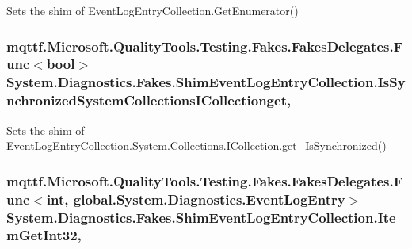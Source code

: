 Sets the shim of Event\-Log\-Entry\-Collection.\-Get\-Enumerator()

\hypertarget{class_system_1_1_diagnostics_1_1_fakes_1_1_shim_event_log_entry_collection_ac5a132ce5957031fd8fbc2b34b621eaf}{
\subsubsection[{Is\-Synchronized\-System\-Collections\-I\-Collectionget}]{\setlength{\rightskip}{0pt plus 5cm}mqttf.\-Microsoft.\-Quality\-Tools.\-Testing.\-Fakes.\-Fakes\-Delegates.\-Func$<$bool$>$ System.\-Diagnostics.\-Fakes.\-Shim\-Event\-Log\-Entry\-Collection.\-Is\-Synchronized\-System\-Collections\-I\-Collectionget\hspace{0.3cm}{\ttfamily [get]}, {\ttfamily [set]}}}\label{class_system_1_1_diagnostics_1_1_fakes_1_1_shim_event_log_entry_collection_ac5a132ce5957031fd8fbc2b34b621eaf}


Sets the shim of Event\-Log\-Entry\-Collection.\-System.\-Collections.\-I\-Collection.\-get\-\_\-\-Is\-Synchronized()

\hypertarget{class_system_1_1_diagnostics_1_1_fakes_1_1_shim_event_log_entry_collection_a33ab105e1174a3dd3427a8e2fb27635a}{
\subsubsection[{Item\-Get\-Int32}]{\setlength{\rightskip}{0pt plus 5cm}mqttf.\-Microsoft.\-Quality\-Tools.\-Testing.\-Fakes.\-Fakes\-Delegates.\-Func$<$int, global.\-System.\-Diagnostics.\-Event\-Log\-Entry$>$ System.\-Diagnostics.\-Fakes.\-Shim\-Event\-Log\-Entry\-Collection.\-Item\-Get\-Int32\hspace{0.3cm}{\ttfamily [get]}, {\ttfamily [set]}}}\label{class_system_1_1_diagnostics_1_1_fakes_1_1_shim_event_log_entry_collection_a33ab105e1174a3dd3427a8e2fb27635a}


